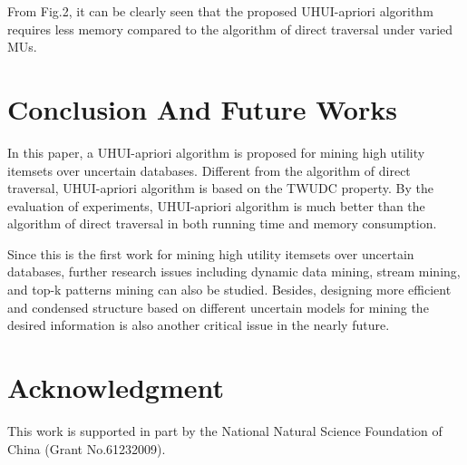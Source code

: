\documentclass[conference]{IEEEtran}
\begin{document}
From Fig.2, it can be clearly seen that the proposed UHUI-apriori algorithm requires less memory compared to the algorithm of direct traversal under varied MUs.

\section{Conclusion And Future Works}
In this paper, a UHUI-apriori algorithm is proposed for mining high utility itemsets over uncertain databases. Different from the algorithm of direct traversal, UHUI-apriori algorithm is based on the TWUDC property. By the evaluation of experiments, UHUI-apriori algorithm is much better than the algorithm of direct traversal in both running time and memory consumption.

Since this is the first work for mining high utility itemsets over uncertain databases, further research issues including dynamic data mining, stream mining, and top-k patterns mining can also be studied. Besides, designing more efficient and condensed structure based on different uncertain models for mining the desired information is also another critical issue in the nearly future.






\section*{Acknowledgment}
This work is supported in part by the National Natural Science Foundation of China (Grant No.61232009).







\end{document}

